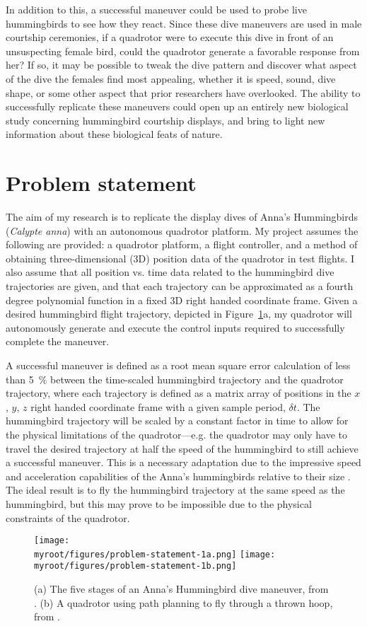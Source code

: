 \documentclass[onecolumn,10pt]{IEEEtran}
\newcommand{\myroot}{../}
\newcommand{\Calypteanna}{\emph{Calypte anna}}
\begin{document}
In addition to this, a successful maneuver could be used to probe live hummingbirds to see how they react. Since these dive maneuvers are used in male courtship ceremonies, if a quadrotor were to execute this dive in front of an unsuspecting female bird, could the quadrotor generate a favorable response from her? If so, it may be possible to tweak the dive pattern and discover what aspect of the dive the females find most appealing, whether it is speed, sound, dive shape, or some other aspect that prior researchers have overlooked. The ability to successfully replicate these maneuvers could open up an entirely new biological study concerning hummingbird courtship displays, and bring to light new information about these biological feats of nature.

\section{Problem statement}
The aim of my research is to replicate the display dives of Anna’s Hummingbirds (\Calypteanna) with an autonomous quadrotor platform. My project assumes the following are provided: a quadrotor platform, a flight controller, and a method of obtaining three-dimensional (3D) position data of the quadrotor in test flights. I also assume that all position vs. time data related to the hummingbird dive trajectories are given, and that each trajectory can be approximated as a fourth degree polynomial function in a fixed 3D right handed coordinate frame. Given a desired hummingbird flight trajectory, depicted in Figure~\ref{fig-problem-statement-1}a, my quadrotor will autonomously generate and execute the control inputs required to successfully complete the maneuver. 

A successful maneuver is defined as a root mean square error calculation of less than \SI{5}{\percent} between the time-scaled hummingbird trajectory and the quadrotor trajectory, where each trajectory is defined as a matrix array of positions in the $x$, $y$, $z$ right handed coordinate frame with a given sample period, $\delta t$. The hummingbird trajectory will be scaled by a constant factor in time to allow for the physical limitations of the quadrotor—e.g. the quadrotor may only have to travel the desired trajectory at half the speed of the hummingbird to still achieve a successful maneuver. This is a necessary adaptation due to the impressive speed and acceleration capabilities of the Anna’s hummingbirds relative to their size \cite{clark2009courtship}. The ideal result is to fly the hummingbird trajectory at the same speed as the hummingbird, but this may prove to be impossible due to the physical constraints of the quadrotor.
\begin{figure}[h]
\begin{center}
\texttt{[image: \\myroot/figures/problem-statement-1a.png]}%
\texttt{[image: \\myroot/figures/problem-statement-1b.png]}
\end{center}
\caption{(a) The five stages of an Anna’s Hummingbird dive maneuver, from \cite{clark2009courtship}. (b) A quadrotor using path planning to fly through a thrown hoop, from \cite{mellinger2011minimum}.}
\label{fig-problem-statement-1}
\end{figure}
\end{document}
